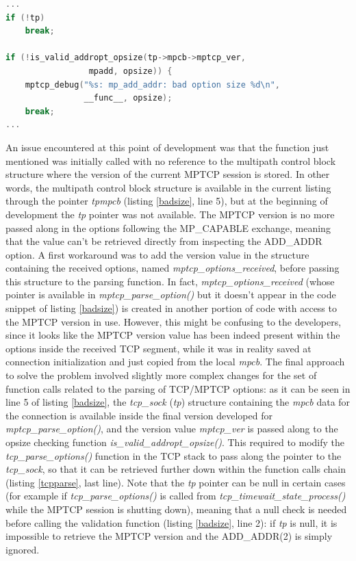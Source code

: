 \begin{lstlisting}[language=c, caption=Check ADD\_ADDR(2) size at the receiver inside \textit{mptcp\_parse\_option()}, label=badsize]
...
if (!tp)
	break;

if (!is_valid_addropt_opsize(tp->mpcb->mptcp_ver,
			     mpadd, opsize)) {
	mptcp_debug("%s: mp_add_addr: bad option size %d\n",
     		    __func__, opsize);
 	break;
...
\end{lstlisting}

An issue encountered at this point of development was that the function just mentioned was initially called with no reference to the multipath control block structure where the version of the current MPTCP session is stored. In other words, the multipath control block structure is available in the current listing through the pointer \textit{tp\textrightarrow mpcb} (listing \ref{badsize}, line 5), but at the beginning of development the \textit{tp} pointer was not available. The MPTCP version is no more passed along in the options following the MP\_CAPABLE exchange, meaning that the value can't be retrieved directly from inspecting the ADD\_ADDR option. A first workaround was to add the version value in the structure containing the received options, named \textit{mptcp\_options\_received}, before passing this structure to the parsing function. In fact, \textit{mptcp\_options\_received} (whose pointer is available in \textit{mptcp\_parse\_option()} but it doesn't appear in the code snippet of listing \ref{badsize}) is created in another portion of code with access to the MPTCP version in use. However, this might be confusing to the developers, since it looks like the MPTCP version value has been indeed present within the options inside the received TCP segment, while it was in reality saved at connection initialization and just copied from the local \textit{mpcb}. The final approach to solve the problem involved slightly more complex changes for the set of function calls related to the parsing of TCP/MPTCP options: as it can be seen in line 5 of listing \ref{badsize}, the \textit{tcp\_sock} (\textit{tp}) structure containing the \textit{mpcb} data for the connection is available inside the final version developed for \textit{mptcp\_parse\_option()}, and the version value \textit{mptcp\_ver} is passed along to the opsize checking function \textit{is\_valid\_addropt\_opsize()}. This required to modify the \textit{tcp\_parse\_options()} function in the TCP stack to pass along the pointer to the \textit{tcp\_sock}, so that it can be retrieved further down within the function calls chain (listing \ref{tcpparse}, last line). Note that the \textit{tp} pointer can be null in certain cases (for example if \textit{tcp\_parse\_options()} is called from \textit{tcp\_timewait\_state\_process()} while the MPTCP session is shutting down), meaning that a null check is needed before calling the validation function (listing \ref{badsize}, line 2): if \textit{tp} is null, it is impossible to retrieve the MPTCP version and the ADD\_ADDR(2) is simply ignored.

